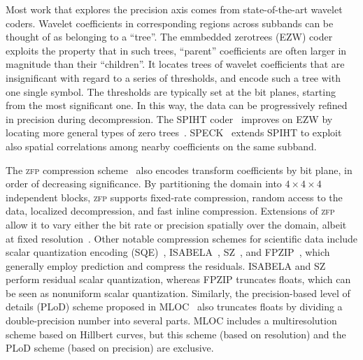 Most work that explores the precision axis comes from state-of-the-art wavelet coders. Wavelet
coefficients in corresponding regions across subbands can be thought of as belonging to a ``tree''.
The emmbedded zerotrees (EZW) coder exploits the property that in such trees, ``parent''
coefficients are often larger in magnitude than their ``children''. It locates trees of wavelet
coefficients that are insignificant with regard to a series of thresholds, and encode such a tree
with one single symbol. The thresholds are typically set at the bit planes, starting from the most
significant one. In this way, the data can be progressively refined in precision during
decompression. The SPIHT coder~\cite{spiht1996} improves on EZW by locating more general types of
zero trees~\cite{quantifying-coding-performance}. SPECK~\cite{speck2004} extends SPIHT to exploit
also spatial correlations among nearby coefficients on the same subband.

\newcommand{\zfp}{\textsc{zfp}\xspace}
The \zfp compression scheme~\cite{zfp2014} also encodes transform coefficients by bit plane, in
order of decreasing significance. By partitioning the domain into $4 \times 4 \times 4$ independent
blocks, \zfp supports fixed-rate compression, random access to the data, localized decompression,
and fast inline compression. Extensions of \zfp allow it to vary either the bit rate or precision
spatially over the domain, albeit at fixed resolution~\cite{zfp-arc}. Other notable compression
schemes for scientific data include scalar quantization encoding (SQE)~\cite{sqe},
ISABELA~\cite{isabela}, SZ~\cite{sz}, and FPZIP~\cite{fpzip}, which generally employ prediction and
compress the residuals. ISABELA and SZ perform residual scalar quantization, whereas FPZIP truncates
floats, which can be seen as nonuniform scalar quantization. Similarly, the precision-based level of
details (PLoD) scheme proposed in MLOC~\cite{mloc} also truncates floats by dividing a
double-precision number into several parts. MLOC includes a multiresolution scheme based on Hillbert
curves, but this scheme (based on resolution) and the PLoD scheme (based on precision) are
exclusive.

